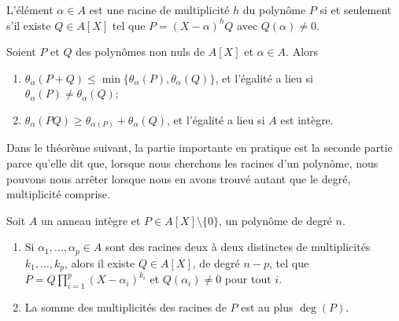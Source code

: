 \begin{proposition} \label{PropahQQpA}
  L'élément \( \alpha\in A\) est une racine de multiplicité \( h\) du
  polynôme \( P\) si et seulement s'il existe \( Q\in A[X]\) tel que
  \( P=(X-\alpha)^hQ\) avec \( Q(\alpha)\neq 0\).
\end{proposition}

\begin{lemma}       \label{LemIeLhpc}
    Soient \( P\) et \( Q\) des polynômes non nuls de \( A[X]\) et \( \alpha\in A\). Alors
    \begin{enumerate}
        \item
            \( \theta_{\alpha}(P+Q)\leq\min\{
            \theta_{\alpha}(P),\theta_{\alpha}(Q) \}\), et l'égalité a
            lieu si \( \theta_{\alpha}(P)\neq \theta_{\alpha}(Q)\);
        \item     \label{ItemIeLhpciv}
            \( \theta_{\alpha}(PQ)\geq
            \theta_{\alpha(P)}+\theta_{\alpha}(Q)\), et l'égalité a
            lieu si \( A \) est intègre.
    \end{enumerate}
\end{lemma}

Dans le théorème suivant, la partie importante en pratique est la seconde partie parce qu'elle dit que, lorsque nous cherchons les racines d'un polynôme, nous pouvons nous arrêter lorsque nous en avons trouvé autant que le degré, multiplicité comprise.
\begin{theorem} \label{ThoSVZooMpNANi}
    Soit \( A\) un anneau intègre
  et \( P\in A[X]\setminus\{ 0 \}\), un polynôme de degré \( n\). 

  \begin{enumerate}
      \item
  Si \( \alpha_1,\ldots, \alpha_p\in A\) sont des racines deux à deux
  distinctes de multiplicités \( k_1,\ldots, k_p\), alors il existe \(
  Q\in A[X]\), de degré \( n-p\), tel que \(
  P=Q\prod_{i=1}^p(X-\alpha_i)^{k_i}\) et \( Q(\alpha_i)\neq 0\) pour
  tout $i$.
  \item     \label{ITEMooWGOBooGApPOo}
    La somme des multiplicités des racines de \( P\) est au plus \( \deg(P)\).
  \end{enumerate}
\end{theorem}

